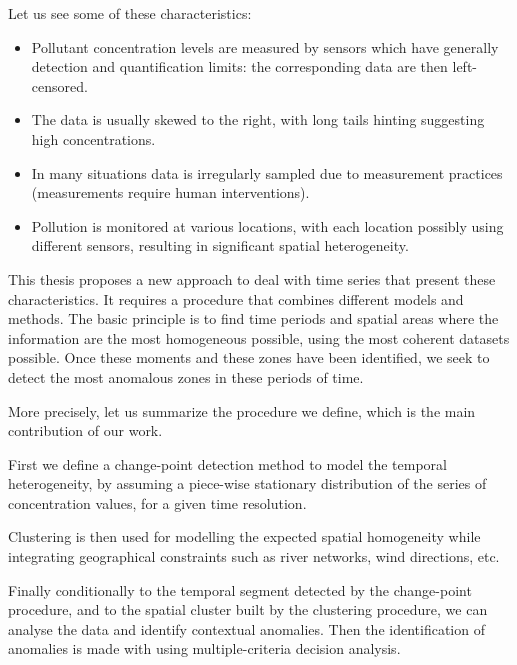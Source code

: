 Let us see some of these characteristics:
\begin{itemize}
\item Pollutant concentration levels are measured by sensors which have generally detection and quantification limits: the corresponding data are then left-censored.
\item The data is usually skewed to the right, with long tails hinting suggesting high concentrations.
\item In many situations data is irregularly sampled due to measurement practices (measurements require human interventions).
\item Pollution is monitored at various locations, with each location possibly using different sensors, resulting in significant spatial heterogeneity.
\end{itemize}

This thesis proposes a new approach to deal with time series that present these characteristics. It requires a procedure that combines different models and methods. The basic principle is to find time periods and spatial areas where the information are the most homogeneous possible, using the most coherent datasets possible. Once these moments and these zones have been identified, we seek to detect the most anomalous zones in these periods of time. 

More precisely, let us summarize the procedure we define, which is the main contribution of our work. 

First we define a change-point detection method to model the temporal heterogeneity, by assuming a piece-wise stationary distribution of the series of concentration values, for a given time resolution. 

Clustering is then used for modelling the expected spatial homogeneity while integrating geographical constraints such as river networks, wind directions, etc. 

Finally conditionally to the temporal segment detected by the change-point procedure, and to the spatial cluster built by the clustering procedure, we can analyse the data and identify contextual anomalies. Then the identification of anomalies is made with using multiple-criteria decision analysis.

